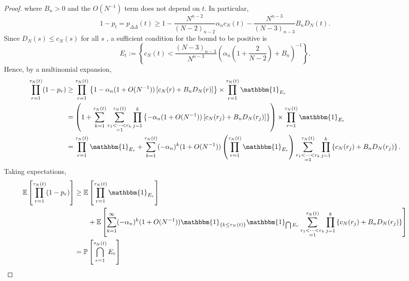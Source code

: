 \documentclass{article}
\newcommand{\Prob}{\mathbb{P}}
\newcommand{\E}{\mathbb{E}}
\newcommand{\I}[1]{\mathbbm{1}_{\{#1\}}}
\newcommand{\1}[1]{\mathbbm{1}_{#1}}
\begin{document}
\begin{proof}
where $B_n >0$ and the $O(N^{-1})$ term does not depend on $t$.
In particular,
\begin{equation}
1-p_t = p_{\Delta\Delta}(t) \geq 1 - \frac{N^{n-2}}{(N-2)_{n-2}} \alpha_n c_N(t) - \frac{N^{n-3}}{(N-3)_{n-3}} B_n D_N(t) .
\end{equation}
Since $D_N(s) \leq c_N(s)$ for all $s$ \citep[p.9]{koskela2018}, a sufficient condition for the bound to be positive is
\begin{equation}\label{eq:11a}
E_t := \left\{ c_N(t) < \frac{(N-3)_{n-3}}{N^{n-3}} \left( \alpha_n \left(1 + \frac{2}{N-2} \right) + B_n \right)^{-1} \right\} .
\end{equation}
Hence, by a multinomial expansion,
\begin{align}
\prod_{r=1}^{\tau_N(t)} (1-p_r)
&\geq \prod_{r=1}^{\tau_N(t)} \left\{ 1 - \alpha_n (1+O(N^{-1}))\left[ c_N(r) + B_n D_N(r) \right] \right\}
\times \prod_{r=1}^{\tau_N(t)} \1{E_r} \notag\\
&= \left( 1 + \sum_{k=1}^{\tau_N(t)} \sum_{\substack{r_1<\dots<r_k \\ =1}}^{\tau_N(t)}\prod_{j=1}^k 
\left\{ - \alpha_n (1+O(N^{-1})) \left[ c_N(r_j) + B_n D_N(r_j) \right] \right\} \right)
\times \prod_{r=1}^{\tau_N(t)} \1{E_r} \notag\\
&= \prod_{r=1}^{\tau_N(t)} \1{E_r} 
+ \sum_{k=1}^{\tau_N(t)} (- \alpha_n)^k (1+O(N^{-1})) 
\left(\prod_{r=1}^{\tau_N(t)} \1{E_r} \right)
\sum_{\substack{r_1<\dots<r_k \\ =1}}^{\tau_N(t)}\prod_{j=1}^k 
\left\{ c_N(r_j) + B_n D_N(r_j) \right\} . \label{eq:12}
\end{align}
Taking expectations,
\begin{align}\label{eq:9}
\E \left[ \prod_{r=1}^{\tau_N(t)} (1-p_r) \right]
&\geq \E\left[ \prod_{r=1}^{\tau_N(t)} \1{E_r} \right] \notag\\
&\qquad + \E \left[ \sum_{k=1}^{\infty} (- \alpha_n)^k (1+O(N^{-1})) \I{k \leq \tau_N(t)} \1{\bigcap E_r} \sum_{\substack{r_1<\dots<r_k \\ =1}}^{\tau_N(t)}\prod_{j=1}^k 
\left\{ c_N(r_j) + B_n D_N(r_j) \right\} \right] \notag\\
&= \Prob \left[ \bigcap_{r=1}^{\tau_N(t)} E_r \right] \notag\\

\end{align}
\end{proof}
\end{document}
